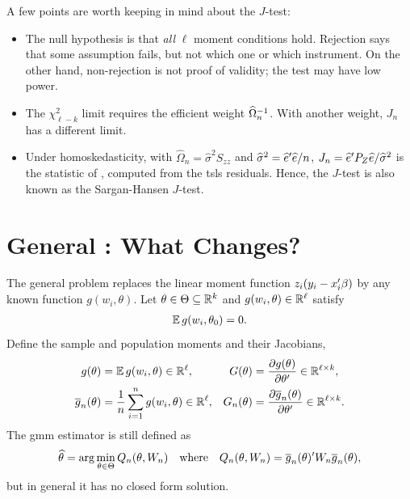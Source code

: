 \documentclass[a4paper,12pt]{article}
\begin{document}
\begin{remark}
	A few points are worth keeping in mind about the $J$-test:
	\begin{itemize}
		\item
			The null hypothesis is that \emph{all} $\ell$ moment conditions hold.
			Rejection says that some assumption fails, but not which one or which instrument.
			On the other hand, non-rejection is not proof of validity; the test may have low power.
		\item
			The $\chi^2_{\ell-k}$ limit requires the efficient weight $\widehat\Omega_n^{-1}$.
			With another weight, $J_n$ has a different limit.
		\item
			Under homoskedasticity, with $\widehat\Omega_n=\widehat\sigma^2S_{zz}$ and $\widehat\sigma^2=\widehat e^{\prime}\widehat e/n$,
			$J_n=\widehat e^{\prime} P_Z\widehat e/\widehat\sigma^2$ is the statistic of \textcite{sargan-1958},
			computed from the \gls{tsls} residuals.
			Hence, the $J$-test is also known as the Sargan-Hansen $J$-test.
	\end{itemize}
\end{remark}

\section{General : What Changes?}\label{sec-general-gmm}

The general problem replaces the linear moment function $z_i(y_i-x_i^{\prime}\beta)$ by any known function $g(w_i,\theta)$.
Let $\theta\in\Theta\subseteq\mathbb{R}^k$ and $g(w_i,\theta)\in\mathbb{R}^\ell$ satisfy
\begin{align}
	\operatorname{\mathbb{E}} g(w_i,\theta_0)=0.
\end{align}
Define the sample and population moments and their Jacobians,
\begin{align*}
	g(\theta) &= \operatorname{\mathbb{E}} g(w_i,\theta)\in\mathbb{R}^{\ell}, &
	G(\theta) &= \frac{\partial g(\theta)}{\partial\theta^{\prime}}\in\mathbb{R}^{\ell\times k},  \\
	\overline g_n(\theta) &= \frac1n\sum_{i=1}^ng(w_i,\theta)\in\mathbb{R}^{\ell}, &
	G_n(\theta) &= \frac{\partial\overline g_n(\theta)}{\partial\theta^{\prime}}\in\mathbb{R}^{\ell\times k}.
\end{align*}
The \gls{gmm} estimator is still defined as
\begin{align}\label{eq-general-gmm}
	\widehat\theta=\arg\min_{\theta\in\Theta} Q_n(\theta,W_n)
	\quad\text{where}\quad
	Q_n(\theta,W_n) = \overline g_n(\theta)^{\prime} W_n\overline g_n(\theta),
\end{align}
but in general it has no closed form solution.
\end{document}
